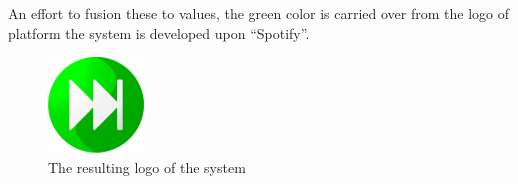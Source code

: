 An effort to fusion these to values, the green color is carried over from the logo of platform the system is developed upon \enquote{Spotify}.

\begin{figure}
  \centering
  \includegraphics[width=0.5\linewidth]{Images/Icon.png}
  \caption{The resulting logo of the system}
  \label{fig:logo}
\end{figure}